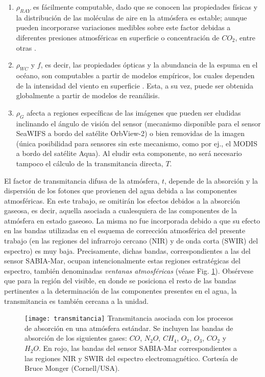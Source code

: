 \begin{enumerate}
\item $\rho_{RAY}$ es fácilmente computable, dado que se conocen las propiedades físicas y la distribución de las moléculas de aire en la atmósfera es estable; aunque pueden incorporarse variaciones medibles sobre este factor debidas a diferentes presiones atmosféricas en superficie o concentración de $CO_{2}$, entre otras \cite{bodhaine}.
\item $\rho_{WC}$ y $f$, es decir, las propiedades ópticas y la abundancia de la espuma en el océano, son computables a partir de modelos empíricos, los cuales dependen de la intensidad del viento en superficie \cite{koepke}. Esta, a su vez, puede ser obtenida globalmente a partir de modelos de reanálisis.
\item $\rho_{G}$ afecta a regiones específicas de las imágenes que pueden ser eludidas inclinando el ángulo de visión del sensor (mecanismo disponible para el sensor SeaWIFS a bordo del satélite OrbView-2) o bien removidas de la imagen (única posibilidad para sensores sin este mecanismo, como por ej., el MODIS a bordo del satélite Aqua). Al eludir esta componente, no será necesario tampoco el cálculo de la transmitancia directa, $T$.
\end{enumerate}

El factor de transmitancia difusa de la atmósfera, $t$, depende de la absorción y la dispersión de los fotones que provienen del agua debida a las componentes atmosféricas. En este trabajo, se omitirán los efectos debidos a la absorción gaseosa, es decir, aquella asociada a cualesquiera de las componentes de la atmósfera en estado gaseoso. La misma no fue incorporada debido a que su efecto en las bandas utilizadas en el esquema de corrección atmosférica del presente trabajo (en las regiones del infrarrojo cercano (NIR) y de onda corta (SWIR) del espectro) es muy baja. Precisamente, dichas bandas, correspondientes a las del sensor SABIA-Mar, ocupan intencionalmente estas regiones estratégicas del espectro, también denominadas \textit{ventanas atmosféricas} (véase Fig. \ref{fig:transmitancia}). Obsérvese que para la región del visible, en donde se posiciona el resto de las bandas pertinentes a la determinación de las componentes presentes en el agua, la transmitancia es también cercana a la unidad.

\begin{figure}
\centering
\texttt{[image: transmitancia]}
 {Transmitancia asociada con los procesos de absorción en una atmósfera estándar. Se incluyen las bandas de absorción de los siguientes gases: $CO$, $N_{2}O$, $CH_{4}$, $O_{2}$, $O_{3}$, $CO_{2}$ y $H_{2}O$. En rojo, las bandas del sensor SABIA-Mar correspondientes a las regiones NIR y SWIR del espectro electromagnético. Cortesía de Bruce Monger (Cornell/USA).}
\label{fig:transmitancia}
\end{figure}

